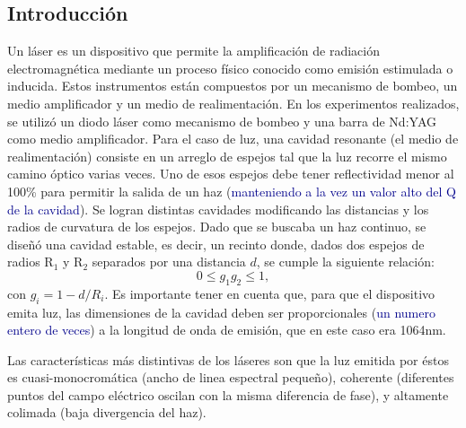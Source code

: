\documentclass[10pt, a4paper]{article}%
\begin{document}
\begin{multicols}{2} %
\tableofcontents %

\section{Introducción}

Un láser es un dispositivo que permite la amplificación de radiación electromagnética mediante un proceso físico conocido como emisión estimulada o inducida. Estos instrumentos están compuestos por un mecanismo de bombeo, un medio amplificador y un medio de realimentación. En los experimentos realizados, se utilizó un diodo láser como mecanismo de bombeo y una barra de Nd:YAG como medio amplificador. Para el caso de luz, una cavidad resonante (el medio de realimentación) consiste en un arreglo de espejos tal que la luz recorre el mismo camino óptico varias veces. Uno de esos espejos debe tener reflectividad menor al 100\% para permitir la salida de un haz (\textcolor{DarkBlue}{manteniendo a la vez un valor alto del Q de la cavidad}). Se logran distintas cavidades modificando las distancias y los radios de curvatura de los espejos. Dado que se buscaba un haz continuo, se diseñó una cavidad estable, es decir, un recinto donde, dados dos espejos de radios R$_1$ y R$_2$ separados por una distancia $d$, se cumple la siguiente relación:
\begin{equation}
    0 \leq g_1 g_2 \leq 1,
\end{equation}
con $g_i = 1 - d/R_i$. Es importante tener en cuenta que, para que el dispositivo emita luz, las dimensiones de la cavidad deben ser proporcionales (\textcolor{DarkBlue}{un numero entero de veces}) a la longitud de onda de emisión, que en este caso era 1064nm.

Las características más distintivas de los láseres son que la luz emitida por éstos es cuasi-monocromática (ancho de linea espectral pequeño), coherente (diferentes puntos del campo eléctrico oscilan con la misma diferencia de fase), y altamente colimada (baja divergencia del haz).



\end{multicols}
\end{document}
